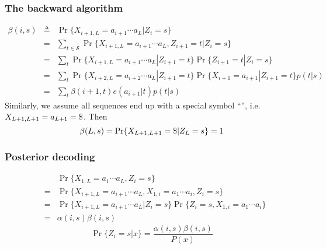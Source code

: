 \documentclass[10pt]{article}
\begin{document}
\subsubsection{The backward algorithm}
\begin{eqnarray*}
\beta(i,s)&\triangleq&\Pr\{X_{i+1,L}=a_{i+1}\cdots a_L|Z_i=s\}\\
&=&\sum_{t\in\mathcal{S}}\Pr\{X_{i+1,L}=a_{i+1}\cdots a_L,Z_{i+1}=t|Z_i=s\}\\
&=&\sum_t\Pr\{X_{i+1,L}=a_{i+1}\cdots a_L|Z_{i+1}=t\}\Pr\{Z_{i+1}=t|Z_i=s\}\\
&=&\sum_t\Pr\{X_{i+2,L}=a_{i+2}\cdots a_L|Z_{i+1}=t\}\Pr\{X_{i+1}=a_{i+1}|Z_{i+1}=t\}p(t|s)\\
&=&\sum_t\beta(i+1,t)e(a_{i+1}|t)p(t|s)
\end{eqnarray*}
Similarly, we assume all sequences end up with a special symbol
``{\tt{}}'', i.e. $X_{L+1,L+1}=a_{L+1}={\tt\char36}$. Then
$$
\beta(L,s)=\Pr\{X_{L+1,L+1}={\tt\char36}|Z_L=s\}=1
$$

\subsubsection{Posterior decoding}
\begin{eqnarray*}
&& \Pr\{X_{1,L}=a_1\cdots a_L,Z_i=s\}\\
&=&\Pr\{X_{i+1,L}=a_{i+1}\cdots a_L,X_{1,i}=a_1\cdots a_i,Z_i=s\}\\
&=&\Pr\{X_{i+1,L}=a_{i+1}\cdots a_L|Z_i=s\}\Pr\{Z_i=s,X_{1,i}=a_1\cdots a_i\}\\
&=&\alpha(i,s)\beta(i,s)
\end{eqnarray*}
$$
\Pr\{Z_i=s|x\}=\frac{\alpha(i,s)\beta(i,s)}{P(x)}
$$
\end{document}
